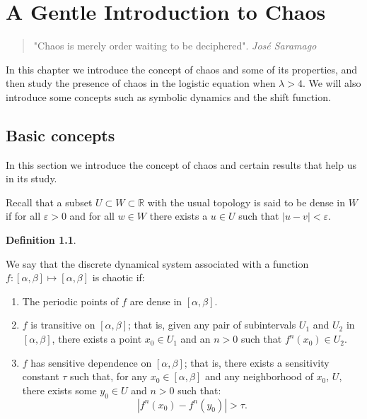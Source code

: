 \documentclass[12pt,a4paper]{report}
\theoremstyle{definition}
\newtheorem{definicion}{Definition}[section]
\begin{document}
\chapter{A Gentle Introduction to Chaos}\label{chap:caos}

\begin{quote}
\centering
"Chaos is merely order waiting to be deciphered". \textit{José Saramago}
\end{quote}

In this chapter we introduce the concept of chaos and some of its properties, and then study the presence of chaos in the logistic equation when $\lambda > 4$. We will also introduce some concepts such as symbolic dynamics and the shift function.

\section{Basic concepts}

In this section we introduce the concept of chaos and certain results that help us in its study.


Recall that a subset $ U \subset W \subset \mathbb{R}$ with the usual topology is said to be dense in $ W $ if for all $\varepsilon > 0$ and for all $w \in W$ there exists a $u \in U$ such that $|u - v| < \varepsilon$.

\medskip

\begin{definicion}\label{def:devaney}

We say that the discrete dynamical system associated with a function $ f : [\alpha, \beta] \mapsto [\alpha, \beta]$ is chaotic if:

\begin{enumerate}
    \item The periodic points of $ f $ are dense in $ [\alpha, \beta] $.
    \item $ f $ is transitive on $ [\alpha, \beta] $; that is, given any pair of subintervals $ U_1 $ and $ U_2 $ in $ [\alpha, \beta] $, there exists a point $ x_0 \in U_1 $ and an $ n > 0 $ such that $ f^n(x_0) \in U_2 $.
    \item $ f $ has sensitive dependence on $  [\alpha, \beta] $; that is, there exists a sensitivity constant $ \tau $ such that, for any $ x_0 \in [\alpha, \beta] $ and any neighborhood of $ x_0 $, $ U $, there exists some $ y_0 \in U $ and $ n > 0 $ such that:
    \[
    |f^n(x_0) - f^n(y_0)| > \tau.
    \]
\end{enumerate}

\end{definicion}
\end{document}
